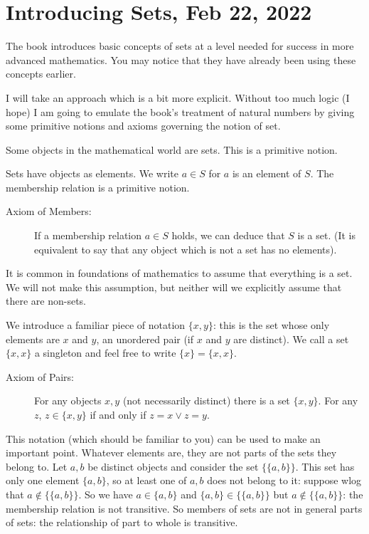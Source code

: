 \documentclass[12pt]{article}
\begin{document}
\newpage

\section{Introducing Sets, Feb 22, 2022}

The book introduces basic concepts of sets at a level needed for success in more advanced mathematics.  You may notice that they have already been using these concepts earlier.

I will take an approach which is a bit more explicit.   Without too much logic (I hope) I am going to emulate the book's treatment of natural numbers by giving some primitive notions and axioms governing the notion of set.

Some objects in the mathematical world are sets.  This is a primitive notion.

Sets have objects as elements.  We write $a \in S$ for $a$ is an element of $S$.  The membership relation is a primitive notion.

\begin{description}

\item[Axiom of Members:]  If a membership relation $a \in S$ holds, we can deduce that $S$ is a set.  (It is equivalent to say that any object which is not a set has no elements).

\end{description}

It is common in foundations of mathematics to assume that everything is a set.  We will not make this assumption, but neither will we explicitly assume that there are non-sets.

We introduce a familiar piece of notation $\{x,y\}$:  this is the set whose only elements are $x$ and $y$, an unordered pair (if $x$ and $y$ are distinct).  We call a set $\{x,x\}$ a singleton and feel free to write $\{x\} = \{x,x\}$.

\begin{description}

\item[Axiom of Pairs:]  For any objects $x,y$ (not necessarily distinct) there is a set $\{x,y\}$.  For any $z$, $z \in \{x,y\}$ if and only if $z=x \vee z=y$.

\end{description}

This notation (which should be familiar to you) can be used to make an important point.  Whatever elements are, they are not parts of the sets they belong to.  Let $a,b$ be distinct objects and consider the set $\{\{a,b\}\}$.  This set has only one element $\{a,b\}$, so at least one of $a,b$ does not belong to it:  suppose wlog that $a \not\in \{\{a,b\}\}$.  So we have $a \in \{a,b\}$ and $\{a,b\} \in \{\{a,b\}\}$ but $a \not\in \{\{a,b\}\}$:  the membership relation is not transitive.  So members of sets are not in general parts of sets:  the relationship of part to whole is transitive.
\end{document}
